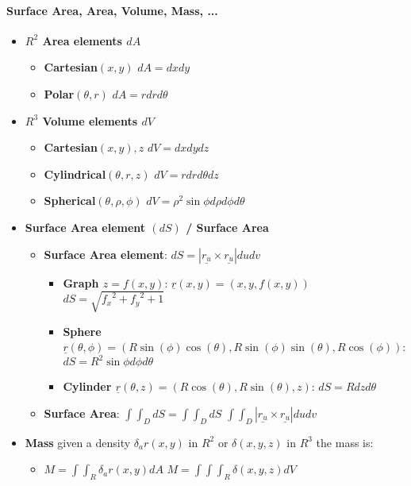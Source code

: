 \documentclass[8pt, twocolumn]{article}
\begin{document}
\paragraph{Surface Area, Area, Volume, Mass, ...}
\begin{itemize}
	\item \textbf{$R^2$ Area elements $d{A}$}
		\begin{itemize}
			\item \textbf{Cartesian$(x, y)$} $dA = dx dy$
			\item \textbf{Polar$(\theta, r)$} $dA = r dr d\theta$
		\end{itemize}
	\item \textbf{$R^3$ Volume elements $d{V}$}
		\begin{itemize}
			\item \textbf{Cartesian$(x, y), z$} $dV = dx dy dz$
			\item \textbf{Cylindrical$(\theta, r, z)$} $dV = r dr d\theta dz$			
			\item \textbf{Spherical$(\theta, \rho, \phi)$} $dV = \rho^2 \sin{\phi} d\rho d\phi d\theta$
		\end{itemize}	
	\item \textbf{Surface Area element $(dS)$ / Surface Area}
		\begin{itemize}

			\item \textbf{Surface Area element}: $dS = |\underline{r_u} \times \underline{r_u}| du dv$
				\begin{itemize}
					\item \textbf{Graph $z = f(x, y)$}: $\underline{r}(x, y) = (x, y, f(x, y))$ $dS = \sqrt{{f_x}^2 + {f_y}^2 + 1} $
					\item \textbf{Sphere $\underline{r}(\theta, \phi) = (R\sin(\phi)\cos(\theta), R\sin(\phi)\sin(\theta), R\cos(\phi))$}: $dS = R^2\sin{\phi}d\phi d\theta$
					\item \textbf{Cylinder $\underline{r}(\theta, z) = (R\cos(\theta), R\sin(\theta),z)$}: $dS = Rdz d\theta$
				\end{itemize}
			\item \textbf{Surface Area}: $\int\int_D{dS} = \int\int_D{dS}$  $\int\int_D{|\underline{r_u} \times \underline{r_u}| du dv} $
		\end{itemize}
	\item \textbf{Mass} given a density $\delta_ar(x, y)$ in  $R^2$ or $\delta(x, y, z)$ in $R^3$  the mass is: 
		\begin{itemize}
			\item $M = \int\int_R{\delta_ar(x, y)dA}$ $M = \int\int\int_R{\delta(x, y, z)dV}$
		\end{itemize}


	
\end{itemize}
\end{document}
